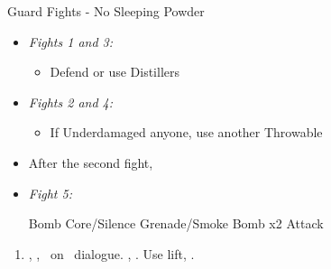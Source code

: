 \begin{battle}{Guard Fights - No Sleeping Powder}
	\begin{itemize}
		\item \textit{Fights 1 and 3:}
		      \begin{itemize}
			      \tidusf Attack
			      \item Defend or use Distillers
		      \end{itemize}
		\item \textit{Fights 2 and 4:}
		      \begin{itemize}
			      \switch{\tidus}{\kimahri}
			      \kimahrif Bomb Core/Silence Grenade/Smoke Bomb
			      \switch{\rikku}{\tidus}
			      \tidusf Attack
			      \kimahrif Repeat
			      \item If Underdamaged anyone, use another Throwable
		      \end{itemize}
		\item After the second fight, \formation{\tidus}{\rikku}{\lulu}
		\item \textit{Fight 5:}
		      \begin{itemize}
			      \switch{\tidus}{\rikku}
			      \rikkuf Bomb Core/Silence Grenade/Smoke Bomb x2
			      \switch{\kimahri}{\tidus}
			      \tidusf Attack
		      \end{itemize}
	\end{itemize}
\end{battle}
\begin{enumerate}[resume]
	\item \sd, \skippablefmv[1:30], \sd\ on \yuna\ dialogue. \skippablefmv[30], \sd. Use lift, \sd.
\end{enumerate}
\bothvfill
\winvfill
\lossvfill
\ 

